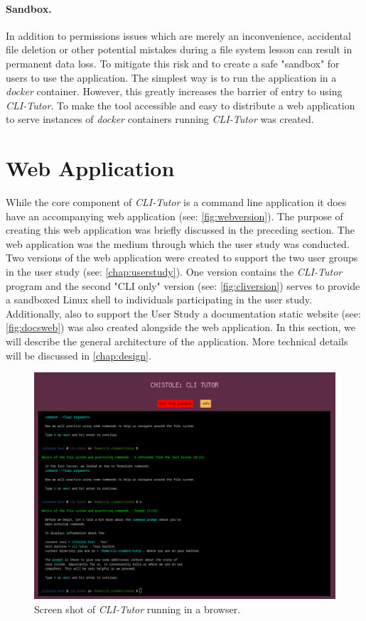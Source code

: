 \paragraph{Sandbox.} In addition to permissions issues which are merely an
inconvenience, accidental file deletion or other potential mistakes during a
file system lesson can result in permanent data loss. To mitigate this risk and
to create a safe "sandbox" for users to use the application. The simplest
way is to run the application in a \textit{docker}\cite{dockerinc_2022}
container. However, this greatly increases the barrier of entry to using
\textit{CLI-Tutor}. To make the tool accessible and easy to distribute
a web application to serve instances of \textit{docker} containers running
\textit{CLI-Tutor} was created.

\section{Web Application}

While the core component of \textit{CLI-Tutor} is a command line application it
does have an accompanying web application (see: \autoref{fig:webversion}). The
purpose of creating this web application was briefly discussed in the preceding
section. The web application was the medium through which the user study was
conducted. Two versions of the web application were created to support the two
user groups in the user study (see: \autoref{chap:userstudy}). One version
contains the \textit{CLI-Tutor} program and the second "CLI only" version (see: \autoref{fig:cliversion})
serves to provide a sandboxed Linux shell to individuals participating in the
user study. Additionally, also to support the User Study a documentation static
website (see: \autoref{fig:docsweb}) was also created alongside the web application. In this section, we
will describe the general architecture of the application. More technical
details will be discussed in \autoref{chap:design}.


\begin{figure}[htbp]
	\centering
	\includegraphics[width=1\textwidth]{img/cliwebshort}
	\caption{Screen shot of \textit{CLI-Tutor} running in a browser.}
	\label{fig:webversion}
\end{figure}

